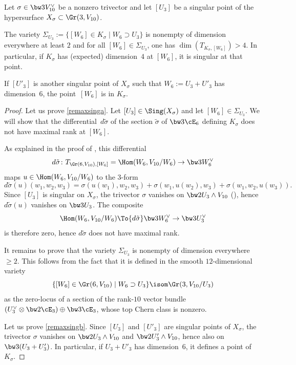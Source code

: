 \begin{prop} \label{remaxsing}
Let $\sigma\in \bw3V_{10}^\vee$ be a nonzero trivector and let $[U_3]$ be a singular point of the hypersurface $X_\sigma\subset \Gr(3,V_{10})$.
\begin{enumeratea}
\item\label{remaxsinga}
The variety $\Sigma_{U_3}:=\{[W_6]\in K_\sigma\mid W_6 \supset U_3\}$ is nonempty of dimension everywhere at least $ 2$ and for all $[W_6]\in \Sigma_{U_3}$, one has $\dim(T_{K_\sigma, [W_6]})>4$. In particular, if $K_\sigma$ has (expected) dimension~$4$ at $ [W_6]$, it is singular at that point.

\item\label{remaxsingb}
If $[U'_3]$ is another singular point of $X_\sigma$ such that $W_6:=U_3+U'_3$ has dimension~$6$, the point~$ [W_6]$ is in $K_\sigma$.
\end{enumeratea}
\end{prop}

\begin{proof}
Let us prove \eqref{remaxsinga}. Let $[U_3]\in\Sing(X_\sigma)$ and let $[W_6]\in\Sigma_{U_3}$.
We will show that the differential~$d\tilde{\sigma}$ of the section $\tilde{\sigma}$ of $\bw3\cE_6$ defining
$K_\sigma$ does not have maximal rank at $[W_6]$.

As explained in the proof of \cite[Prop.\,3.1]{devo}, this differential
\[
d\tilde{\sigma}\colon T_{\Gr(6,V_{10}),[W_6]}=\Hom(W_6,V_{10}/W_6)\to \bw3W_6^\vee
\]
maps $u\in \Hom(W_6,V_{10}/W_6)$ to the 3-form
\[
d\tilde{\sigma}(u)( w_1, w_2, w_3 )= \sigma(u(w_1), w_2, w_3)+\sigma(w_1, u(w_2), w_3)+ \sigma(w_1, w_2, u(w_3)).
\]
Since $[U_3]$ is singular on $X_\sigma$, the trivector $\sigma$ vanishes on $\bw2U_3\wedge V_{10}$ (\cite[Prop.\,3.1]{devo}), hence~$d\tilde{\sigma}(u)$ vanishes on $\bw3U_3$. The composite
\begin{equation}
\label{eqdiff}
\Hom(W_6,V_{10}/W_6)\To{d\tilde{\sigma}} \bw3W_6^\vee
\to \bw3U_3^\vee
\end{equation}
is therefore zero, hence $d\tilde{\sigma}$ does not have maximal rank.

It remains to prove that the variety $\Sigma_{U_3} $ is nonempty of dimension everywhere $\ge 2$. This follows from the fact that it is defined in the smooth $12$-dimensional variety \[
 \{[W_6]\in \Gr(6,V_{10})\mid W_6 \supset U_3\}\isom \Gr(3, V_{10}/U_3)
\] as the zero-locus of a section of the
rank-$10$ vector bundle $(U_3^\vee\otimes \bw2\cE_3)\oplus \bw3\cE_3$, whose top Chern class is nonzero.

Let us prove \eqref{remaxsingb}. Since $[U_3]$ and $[U'_3]$ are singular points of $X_\sigma$, the trivector $\sigma$ vanishes on $\bw2U_3\wedge V_{10}$ and
$\bw2U'_3\wedge V_{10}$, hence also on $\bw3(U_3+U'_3)$. In particular, if $U_3+U'_3$ has dimension~$6$, it defines a point of $K_\sigma$.
\end{proof}

